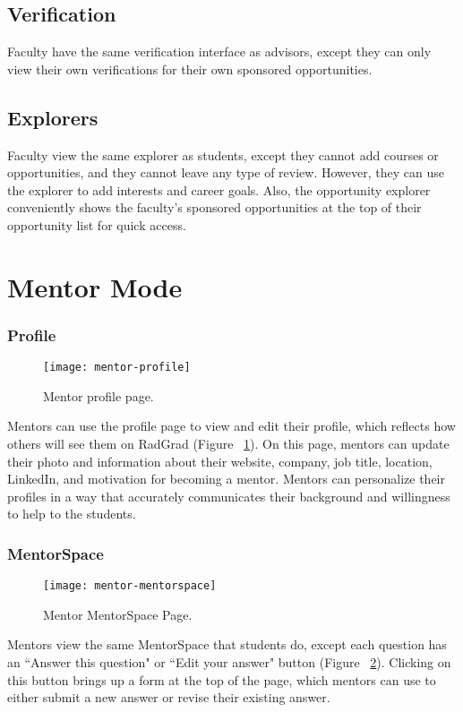 \subsection{Verification}
Faculty have the same verification interface as advisors, except they can only view their own verifications for their own sponsored opportunities. 
\subsection{Explorers}
Faculty view the same explorer as students, except they cannot add courses or opportunities, and they cannot leave any type of review. However, they can use the explorer to add interests and career goals. Also, the opportunity explorer conveniently shows the faculty's sponsored opportunities at the top of their opportunity list for quick access.

\section{Mentor Mode}
\subsubsection{Profile}
\begin{figure}[htbp!]
\centering
\texttt{[image: mentor-profile]}
\caption{Mentor profile page.}
\label{mentor-profile}
\end{figure}
Mentors can use the profile page to view and edit their profile, which reflects how others will see them on RadGrad (Figure ~\ref{mentor-profile}). On this page, mentors can update their photo and information about their website, company, job title, location, LinkedIn, and motivation for becoming a mentor. Mentors can personalize their profiles in a way that accurately communicates their background and willingness to help to the students. 
\subsubsection{MentorSpace}
\begin{figure}[htbp!]
\centering
\texttt{[image: mentor-mentorspace]}
\caption{Mentor MentorSpace Page.}
\label{mentor-mentorspace}
\end{figure}
Mentors view the same MentorSpace that students do, except each question has an ``Answer this question" or ``Edit your answer" button (Figure ~\ref{mentor-mentorspace}). Clicking on this button brings up a form at the top of the page, which mentors can use to either submit a new answer or revise their existing answer. 
